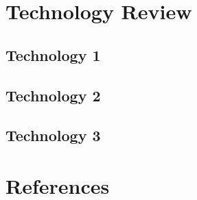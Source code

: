 \section{Technology Review}

\subsection{Technology 1}

\subsection{Technology 2}

\subsection{Technology 3}

\clearpage
\section{References}

\cite{icu}
\cite{xerces}
\cite{xalan}




\clearpage

